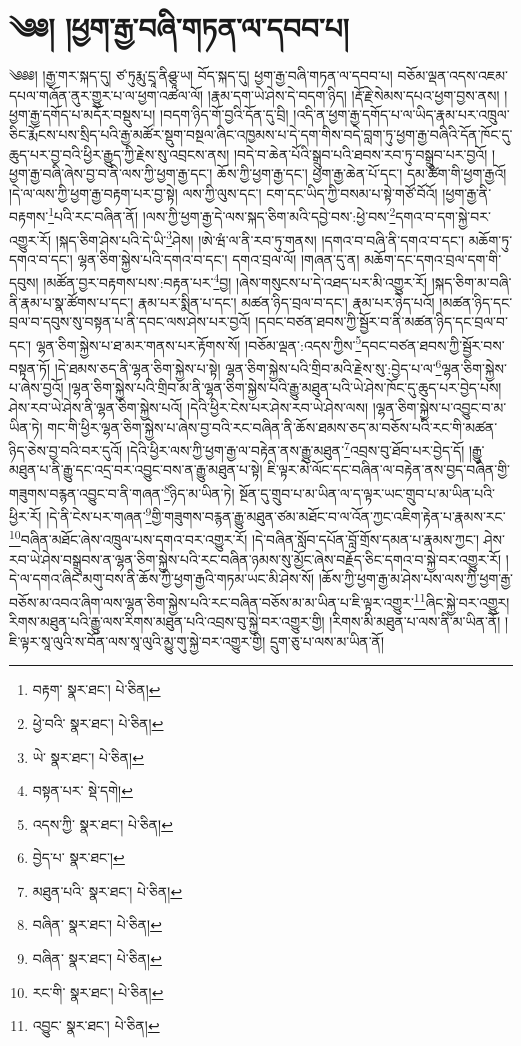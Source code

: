 \setcounter{footnote}{0} 
\chapter{༄༅། །ཕྱག་རྒྱ་བཞི་གཏན་ལ་དབབ་པ།}༄༅༅། །རྒྱ་གར་སྐད་དུ། ཙ་ཏུརྨུ་དྲཱ་ནིཤྩཱ་ཡ། བོད་སྐད་དུ། ཕྱག་རྒྱ་བཞི་གཏན་ལ་དབབ་པ། བཅོམ་ལྡན་འདས་འཇམ་དཔལ་གཞོན་ནུར་གྱུར་པ་ལ་ཕྱག་འཚལ་ལོ། །རྣམ་དག་ཡེ་ཤེས་དེ་བདག་ཉིད། །རྡོ་རྗེ་སེམས་དཔའ་ཕྱག་བྱས་ནས། །ཕྱག་རྒྱ་དགོད་པ་མདོར་བསྡུས་པ། །བདག་ཉིད་གོ་བྱའི་དོན་དུ་བྲི། །འདི་ན་ཕྱག་རྒྱ་དགོད་པ་ལ་ཡིད་རྣམ་པར་འཁྲུལ་ཅིང་རྨོངས་པས་སྲིད་པའི་རྒྱ་མཚོར་སྡུག་བསྔལ་ཞིང་འཁྱམས་པ་དེ་དག་གིས་བདེ་བླག་ཏུ་ཕྱག་རྒྱ་བཞིའི་དོན་ཁོང་དུ་ཆུད་པར་བྱ་བའི་ཕྱིར་རྒྱུད་ཀྱི་རྗེས་སུ་འབྲངས་ནས། །བདེ་བ་ཆེན་པོའི་སྒྲུབ་པའི་ཐབས་རབ་ཏུ་བསྒྲུབ་པར་བྱའོ། །ཕྱག་རྒྱ་བཞི་ཞེས་བྱ་བ་ནི་ལས་ཀྱི་ཕྱག་རྒྱ་དང་། ཆོས་ཀྱི་ཕྱག་རྒྱ་དང་། ཕྱག་རྒྱ་ཆེན་པོ་དང་། དམ་ཚིག་གི་ཕྱག་རྒྱའོ། །དེ་ལ་ལས་ཀྱི་ཕྱག་རྒྱ་བརྟག་པར་བྱ་སྟེ། ལས་ཀྱི་ལུས་དང་། ངག་དང་ཡིད་ཀྱི་བསམ་པ་སྟེ་གཙོ་བོའོ། །ཕྱག་རྒྱ་ནི་བརྟགས་\footnote{བརྟག་  སྣར་ཐང་།  པེ་ཅིན། }པའི་རང་བཞིན་ནོ། །ལས་ཀྱི་ཕྱག་རྒྱ་དེ་ལས་སྐད་ཅིག་མའི་དབྱེ་བས་:ཕྱེ་བས་\footnote{ཕྱེ་བའི་  སྣར་ཐང་།  པེ་ཅིན། }དགའ་བ་དག་སྐྱེ་བར་འགྱུར་རོ། །སྐད་ཅིག་ཤེས་པའི་དེ་ཡི་\footnote{ཡེ་  སྣར་ཐང་།  པེ་ཅིན། }ཤེས། །ཨེ་ཝཾ་ལ་ནི་རབ་ཏུ་གནས། །དགའ་བ་བཞི་ནི་དགའ་བ་དང་། མཆོག་ཏུ་དགའ་བ་དང་། ལྷན་ཅིག་སྐྱེས་པའི་དགའ་བ་དང་། དགའ་བྲལ་ལོ། །གཞན་དུ་ན། མཆོག་དང་དགའ་བྲལ་དག་གི་དབུས། །མཚོན་བྱར་བརྟགས་པས་:བརྟན་པར་\footnote{བསྟན་པར་  སྡེ་དགེ། }བྱ། །ཞེས་གསུངས་པ་དེ་འཐད་པར་མི་འགྱུར་རོ། །སྐད་ཅིག་མ་བཞི་ནི་རྣམ་པ་སྣ་ཚོགས་པ་དང་། རྣམ་པར་སྨིན་པ་དང་། མཚན་ཉིད་བྲལ་བ་དང་། རྣམ་པར་ཉེད་པའོ། །མཚན་ཉིད་དང་བྲལ་བ་དབུས་སུ་བསྟན་པ་ནི་དབང་ལས་ཤེས་པར་བྱའོ། །དབང་བཙན་ཐབས་ཀྱི་སྦྱོར་བ་ནི་མཚན་ཉིད་དང་བྲལ་བ་དང་། ལྷན་ཅིག་སྐྱེས་པ་ཐ་མར་གནས་པར་རྟོགས་སོ། །བཅོམ་ལྡན་:འདས་ཀྱིས་\footnote{འདས་ཀྱི་  སྣར་ཐང་།  པེ་ཅིན། }དབང་བཙན་ཐབས་ཀྱི་སྦྱོར་བས་བསྟན་ཏོ། །དེ་ཐམས་ཅད་ནི་ལྷན་ཅིག་སྐྱེས་པ་སྟེ། ལྷན་ཅིག་སྐྱེས་པའི་གྲིབ་མའི་རྗེས་སུ་:བྱེད་པ་ལ་\footnote{བྱེད་པ་  སྣར་ཐང་། }ལྷན་ཅིག་སྐྱེས་པ་ཞེས་བྱའོ། །ལྷན་ཅིག་སྐྱེས་པའི་གྲིབ་མ་ནི་ལྷན་ཅིག་སྐྱེས་པའི་རྒྱུ་མཐུན་པའི་ཡེ་ཤེས་ཁོང་དུ་ཆུད་པར་བྱེད་པས། ཤེས་རབ་ཡེ་ཤེས་ནི་ལྷན་ཅིག་སྐྱེས་པའོ། །དེའི་ཕྱིར་ངེས་པར་ཤེས་རབ་ཡེ་ཤེས་ལས། །ལྷན་ཅིག་སྐྱེས་པ་འབྱུང་བ་མ་ཡིན་ཏེ། གང་གི་ཕྱིར་ལྷན་ཅིག་སྐྱེས་པ་ཞེས་བྱ་བའི་རང་བཞིན་ནི་ཆོས་ཐམས་ཅད་མ་བཅོས་པའི་རང་གི་མཚན་ཉིད་ཅེས་བྱ་བའི་བར་དུའོ། །དེའི་ཕྱིར་ལས་ཀྱི་ཕྱག་རྒྱ་ལ་བརྟེན་ནས་རྒྱུ་མཐུན་\footnote{མཐུན་པའི་  སྣར་ཐང་།  པེ་ཅིན། }འབྲས་བུ་ཐོབ་པར་བྱེད་དོ། །རྒྱུ་མཐུན་པ་ནི་རྒྱུ་དང་འདྲ་བར་འབྱུང་བས་ན་རྒྱུ་མཐུན་པ་སྟེ། ཇི་ལྟར་མེ་ལོང་དང་བཞིན་ལ་བརྟེན་ནས་བྱད་བཞིན་གྱི་གཟུགས་བརྙན་འབྱུང་བ་ནི་གཞན་\footnote{བཞིན་  སྣར་ཐང་།  པེ་ཅིན། }ཉིད་མ་ཡིན་ཏེ། སྔོན་དུ་གྲུབ་པ་མ་ཡིན་ལ་ད་ལྟར་ཡང་གྲུབ་པ་མ་ཡིན་པའི་ཕྱིར་རོ། །དེ་ནི་ངེས་པར་གཞན་\footnote{བཞིན་  སྣར་ཐང་།  པེ་ཅིན། }གྱི་གཟུགས་བརྙན་རྒྱུ་མཐུན་ཙམ་མཐོང་བ་ལ་འོན་ཀྱང་འཇིག་རྟེན་པ་རྣམས་རང་\footnote{རང་གི་  སྣར་ཐང་།  པེ་ཅིན། }བཞིན་མཐོང་ཞེས་འཁྲུལ་པས་དགའ་བར་འགྱུར་རོ། །དེ་བཞིན་སློབ་དཔོན་བློ་གྲོས་དམན་པ་རྣམས་ཀྱང་། ཤེས་རབ་ཡེ་ཤེས་བསྒྲུབས་ན་ལྷན་ཅིག་སྐྱེས་པའི་རང་བཞིན་ཉམས་སུ་མྱོང་ཞེས་བརྗོད་ཅིང་དགའ་བ་སྐྱེ་བར་འགྱུར་རོ། །དེ་ལ་དགའ་ཞིང་མགུ་བས་ནི་ཆོས་ཀྱི་ཕྱག་རྒྱའི་གཏམ་ཡང་མི་ཤེས་སོ། །ཆོས་ཀྱི་ཕྱག་རྒྱ་མ་ཤེས་པས་ལས་ཀྱི་ཕྱག་རྒྱ་བཅོས་མ་འབའ་ཞིག་ལས་ལྷན་ཅིག་སྐྱེས་པའི་རང་བཞིན་བཅོས་མ་མ་ཡིན་པ་ཇི་ལྟར་འགྱུར་\footnote{འབྱུང་  སྣར་ཐང་།  པེ་ཅིན། }ཞིང་སྐྱེ་བར་འགྱུར། རིགས་མཐུན་པའི་རྒྱུ་ལས་རིགས་མཐུན་པའི་འབྲས་བུ་སྐྱེ་བར་འགྱུར་གྱི། །རིགས་མི་མཐུན་པ་ལས་ནི་མ་ཡིན་ནོ། །ཇི་ལྟར་སཱ་ལུའི་ས་བོན་ལས་སཱ་ལུའི་མྱུ་གུ་སྐྱེ་བར་འགྱུར་གྱི། དྲུག་ཅུ་པ་ལས་མ་ཡིན་ནོ། 